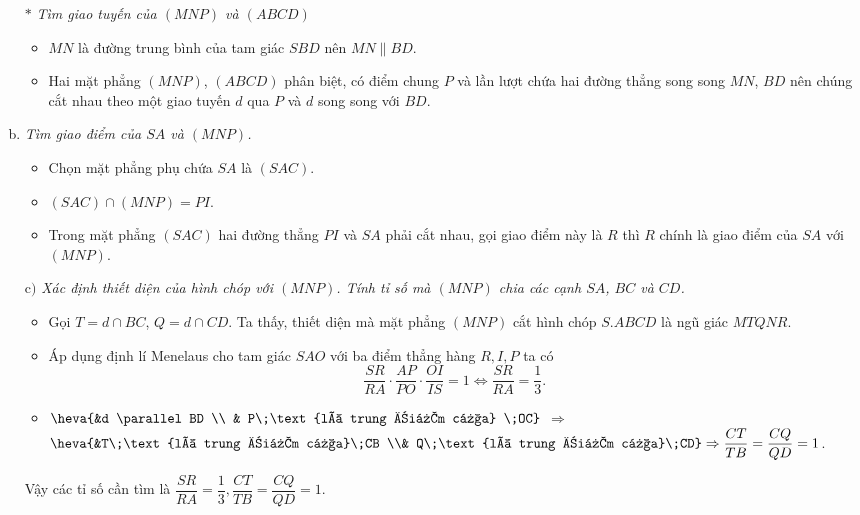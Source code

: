 \begin{bt}
\begin{bt}
{{\begin{tikzpicture}[scale=1, font=\footnotesize, line join=round, line cap=round, >=stealth]
		\end{tikzpicture}}
		\begin{enumerate}[b)]
			\item[$*$] \textit{Tìm giao tuyến của  $(MNP)$ và $(ABCD)$}
			\begin{itemize}
				\item $MN$ là đường trung bình của tam giác $SBD$ nên $MN \parallel BD$.
				\item Hai mặt phẳng $(MNP)$, $(ABCD)$ phân biệt, có điểm chung $P$ và lần lượt chứa hai đường thẳng song song $MN$, $BD$ nên chúng cắt nhau theo một giao tuyến $d$ qua $P$ và $d$ song song với $BD$.
			\end{itemize}
			\item \textit{ Tìm giao điểm của $SA$ và $(MNP)$.}
			\begin{itemize}
				\item  Chọn mặt phẳng phụ chứa $SA$ là $(SAC)$.
				\item $(SAC)\cap (MNP)=PI$.
				\item Trong mặt phẳng $(SAC)$ hai đường thẳng $PI$ và $SA$ phải cắt nhau, gọi giao điểm này là $R$ thì $R$ chính là giao điểm của $SA$ với $(MNP)$.
			\end{itemize}
			\item[$\text{c})$]  \textit{Xác định thiết diện của hình chóp với $(MNP)$. Tính tỉ số mà $(MNP)$ chia các cạnh $SA$, $BC$ và $CD$.}
			\begin{itemize}
				\item  Gọi $T=d\cap BC$, $Q=d\cap CD$. Ta thấy, thiết diện mà mặt phẳng $(MNP)$ cắt hình chóp $S.ABCD$ là ngũ giác $MTQNR$.
				\item 	Áp dụng định lí Menelaus cho tam giác $SAO$ với ba điểm thẳng hàng $R, I, P$ ta có
				$$\dfrac{SR}{RA}\cdot\dfrac{AP}{PO}\cdot\dfrac{OI}{IS}=1\Leftrightarrow \dfrac{SR}{RA}=\dfrac{1}{3}.$$
				\item $\heva{&d \parallel BD \\
					& P\;\text{là trung điểm của} \;OC}$ $\Rightarrow$ $\heva{&T\;\text{là trung điểm của}\;CB \\& Q\;\text{là trung điểm của}\;CD}\Rightarrow \dfrac{CT}{TB}=\dfrac{CQ}{QD}=1$.
			\end{itemize}
			Vậy các tỉ số cần tìm là  $\dfrac{SR}{RA}=\dfrac{1}{3}, \dfrac{CT}{TB}=\dfrac{CQ}{QD}=1.$
	\end{enumerate}}
\end{bt}


\end{bt}

